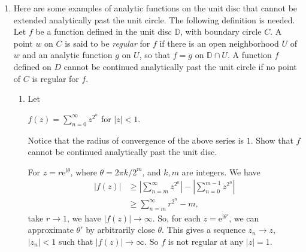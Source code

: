 \documentclass[11pt]{report}
\theoremstyle{mythm}
\let\oldendproof\endproof
\renewenvironment{proof}[1][\proofname]{%
  \oldproof[\normalfont \bfseries #1]%
}{\oldendproof}
\renewcommand*{\proofname}{Proof}
\theoremstyle{myans}
\newcommand{\mi}{\mathrm{i}}
\newcommand{\me}{\mathrm{e}}
\newcommand{\bbD}{\mathbb{D}}
\begin{document}
\begin{enumerate}
  \item Here are some examples of analytic functions on the unit disc that cannot be extended analytically past the unit circle. The following definition is needed. Let
  $f$ be a function defined in the unit disc $\bbD$, with boundary circle $C$. A point $w$ on $C$ is
  said to be \emph{regular} for $f$ if there is an open neighborhood $U$ of $w$ and an analytic
  function $g$ on $U$, so that $f =g$ on $\bbD\cap U$. A function $f$ defined on $D$ cannot be continued
  analytically past the unit circle if no point of $C$ is regular for $f$.
  \begin{enumerate}
    \item Let
    \begin{center}
      $\displaystyle f(z) = \sum_{n=0}^\infty z^{2^n}$ \quad for $|z|<1$.
    \end{center}
    Notice that the radius of convergence of the above series is $1$. Show that $f$
    cannot be continued analytically past the unit disc.
    \begin{proof}
      For $z=r\me^{\mi\theta}$, where $\theta = 2\pi k/2^m$, and $k, m$ are integers. We have
      \begin{align*}
        |f(z)| &\geq  \left| \sum_{n=m}^{\infty} z^{2^n} \right|
        -\left| \sum_{n=0}^{m-1} z^{2^n} \right|\\
        &\geq \sum_{n=m}^{\infty} r^{2^n} - m,
      \end{align*}
      take $r\to 1$, we have $|f(z)| \to \infty$. So, for each $z = \me^{\mi \theta'}$,
      we can approximate $\theta'$ by arbitrarily close $\theta$. This gives a sequence
      $z_n\to z$, $|z_n|<1$ such that $|f(z)|\to \infty$. So $f$ is not regular at
      any $|z|=1$.
    \end{proof}
  \end{enumerate}
\end{enumerate}
\end{document}
